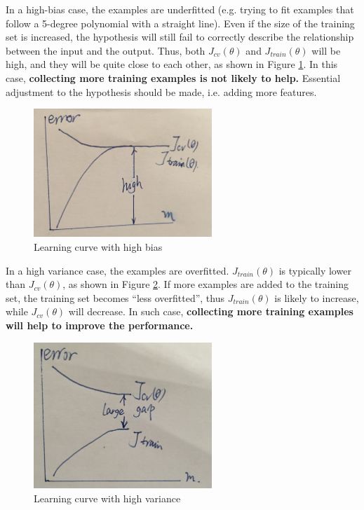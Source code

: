 In a high-bias case, the examples are underfitted (e.g. trying to fit examples that follow a 5-degree polynomial with a straight line). Even if the size of the training set is increased, the hypothesis will still fail to correctly describe the relationship between the input and the output. Thus, both $J_{cv}(\theta)$ and $J_{train}(\theta)$ will be high, and they will be quite close to each other, as shown in Figure \ref{highbiascurve}. In this case, {\bf collecting more training examples is not likely to help.} Essential adjustment to the hypothesis should be made, i.e. adding more features.
\begin{figure}[H]
\centering
\includegraphics[width = 0.6\textwidth]{highbiascurve.jpg}
\caption{Learning curve with high bias}\label{highbiascurve}
\end{figure}

In a high variance case, the examples are overfitted. $J_{train}(\theta)$ is typically lower than $J_{cv}(\theta)$, as shown in Figure \ref{highvariancecurve}. If more examples are added to the training set, the training set becomes ``less overfitted'', thus $J_{train}(\theta)$ is likely to increase, while $J_{cv}(\theta)$ will decrease. In such case, 
{\bf collecting more training examples will help to improve the performance.}
\begin{figure}[H]
\centering
\includegraphics[width = 0.6\textwidth]{highvariancecurve.jpg}
\caption{Learning curve with high variance}\label{highvariancecurve}
\end{figure}
